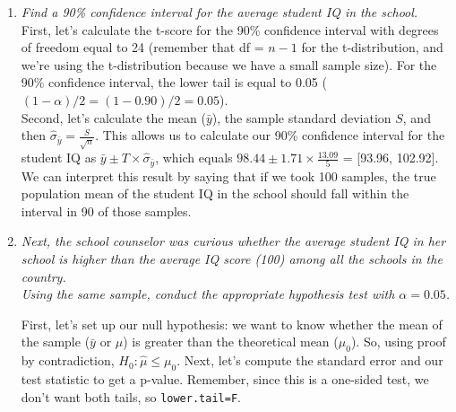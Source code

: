 \documentclass[12pt,letterpaper]{article}
\begin{document}
\begin{enumerate}
	\item \textit{Find a 90\% confidence interval for the average student IQ in the school.}\\
	
	
	\vspace{.15cm}
	\noindent First, let's calculate the t-score for the 90\% confidence interval with degrees of freedom equal to 24 (remember that df = $n-1$ for the t-distribution, and we're using the t-distribution because we have a small sample size). For the 90\% confidence interval, the lower tail is equal to 0.05 ($(1-\alpha)/2 = (1-0.90)/2 = 0.05$).\\
	
	  
	
	\vspace{.15cm}
	\noindent Second, let's calculate the mean ($\bar{y}$),	the sample standard deviation $S$,  and then $\hat{\sigma}_{\bar{y}} = \displaystyle  \frac{S}{\sqrt{n}}$. This allows us to calculate our 90\% confidence interval for the student IQ as $\bar{y} \pm T \times \hat{\sigma}_{\bar{y}}$, which equals $98.44 \pm 1.71 \times \frac{13.09}{5}$ = [93.96, 102.92]. \\
	
	  
	
	\vspace{.15cm}
	\noindent We can interpret this result by saying that if we took 100 samples, the true population mean of the student IQ in the school should fall within the interval in 90 of those samples.\\
	
	\item \textit{Next, the school counselor was curious  whether  the average student IQ in her school is higher than the average IQ score (100) among all the schools in the country.}\\ %
	
	\noindent \textit{Using the same sample, conduct the appropriate hypothesis test with $\alpha=0.05$.}


\vspace{.5cm}

\noindent First, let's set up our null hypothesis: we want to know whether the mean of the sample ($\bar{y}$ or $\hat{\mu}$) is greater than the theoretical mean ($\mu_0$). So, using proof by contradiction, $H_0: \hat{\mu} \leq \mu_0$. Next, let's compute the standard error and our test statistic to get a p-value. Remember, since this is a one-sided test, we don't want both tails, so \texttt{lower.tail=F}.\\



\end{enumerate}
\end{document}
